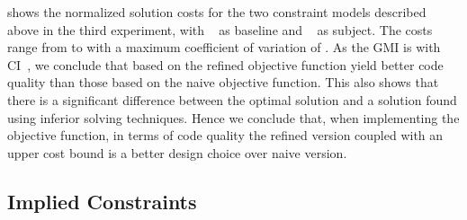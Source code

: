  shows the normalized
\gls{solution} costs for the two \glspl{constraint model} described above in the
third experiment, with ~\modelH{} as \gls{baseline}
and ~\modelI{} as \gls{subject}.
%
The costs range from
\printMinCycles{
  \ObjFunRefinedVsNaiveCyclesSpeedupNaiveWUbCyclesAvgMin,
  \ObjFunRefinedVsNaiveCyclesSpeedupRefinedWUbCyclesAvgMin
} to
\printMaxCycles{
  \ObjFunRefinedVsNaiveCyclesSpeedupNaiveWUbCyclesAvgMax,
  \ObjFunRefinedVsNaiveCyclesSpeedupRefinedWUbCyclesAvgMax
} with a maximum coefficient of variation of
\numMaxOf{
  \ObjFunRefinedVsNaiveCyclesSpeedupNaiveWUbCyclesCvMax,
  \ObjFunRefinedVsNaiveCyclesSpeedupRefinedWUbCyclesCvMax
}.
%
As the \gls{GMI} is \printGMI{%
  \ObjFunRefinedVsNaiveCyclesSpeedupRefinedVsNaiveWUbCyclesRegularSpeedupGmean%
} with \gls{CI}~\printGMICI{%
  \ObjFunRefinedVsNaiveCyclesSpeedupRefinedVsNaiveWUbCyclesRegularSpeedupCiMin%
}{%
  \ObjFunRefinedVsNaiveCyclesSpeedupRefinedVsNaiveWUbCyclesRegularSpeedupCiMax%
}, we conclude that  based on the refined
\gls{objective function} yield better code quality than those based on the naive
\gls{objective function}.
%
This also shows that there is a significant difference between the optimal
\gls{solution} and a \gls{solution} found using inferior solving techniques.
%
Hence we conclude that, when implementing the \gls{objective function}, in terms
of code quality the refined version coupled with an upper cost bound is a better
design choice over naive version.


\subsection{Implied Constraints}



